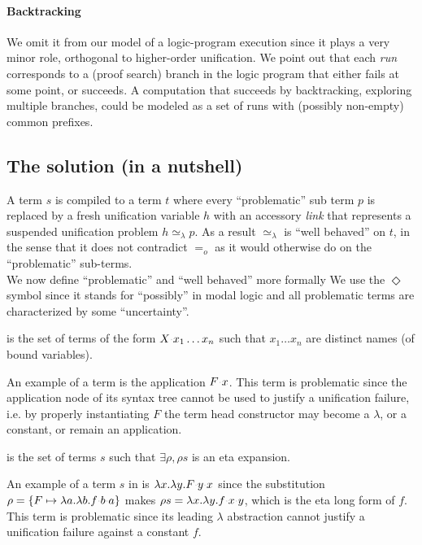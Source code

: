 \documentclass[sigconf,natbib=false,review]{acmart}
\newcommand{\appsep}{\ensuremath{\textcolor{lightgray}{\cdot}}}
\newcommand{\EqualRel}{\ensuremath{=}}
\newcommand{\UnifRel}{\ensuremath{\simeq}}
\newcommand{\Eo}{\ensuremath{\EqualRel_o}\xspace}
\newcommand{\Ue}{\ensuremath{\UnifRel_\lambda}\xspace}
\begin{document}
\paragraph{Backtracking} We omit it from our model of a logic-program execution
since it plays a very minor role, orthogonal to higher-order unification.
We point out that each \emph{run} corresponds to a (proof search) branch in the
logic program that either fails at some point, or succeeds. A computation that
succeeds by backtracking, exploring multiple branches, could be
modeled as a set of runs with (possibly non-empty) common prefixes.

\subsection{The solution (in a nutshell)}
\label{sec:nutshell}
A term $s$ is compiled to a term $t$ where every
``problematic'' sub term $p$ is replaced by a fresh unification variable $h$
with an accessory \emph{link} that represents a suspended unification problem
$h \Ue p$. As a result \Ue is ``well behaved'' on $t$, in the sense that
it does not contradict \Eo as it would otherwise do on the
``problematic'' sub-terms.\\
We now define ``problematic'' and ``well behaved'' more formally
We use the $\Diamond$ symbol since it stands for ``possibly'' in modal logic
and all problematic terms are characterized by some ``uncertainty''.

\begin{definition}[\maybebeta]\label{def:maybebeta}
  \maybebeta is the set of terms of the form $X \appsep x_1 \ldots x_n$
  such that $x_1 \ldots x_n$ are distinct names (of bound variables).
\end{definition}

\noindent
An example of a \maybebeta{} term is the application $F \appsep x$.
This term is problematic since the application node of
its syntax tree cannot be used to justify a
unification failure, i.e. by properly instantiating $F$ the term
head constructor may become a $\lambda$, or a constant, or remain an application.

\begin{definition}[\maybeeta]\label{def:maybeeta}
  \maybeeta is the set of terms $s$ such that $\exists \rho, \rho s$
  is an eta expansion.
\end{definition}

\noindent
An example of a term $s$ in \maybeeta{} is
$\lambda x.\lambda y.F \appsep y \appsep x$
since the substitution
$\rho = \{ F \mapsto \lambda a.\lambda b.f \appsep b \appsep a\}$
makes $\rho s = \lambda x.\lambda y.f \appsep x \appsep y$,
which is the eta long form of $f$. This term is problematic since
its leading $\lambda$ abstraction cannot justify a
unification failure against a constant $f$.
\end{document}
